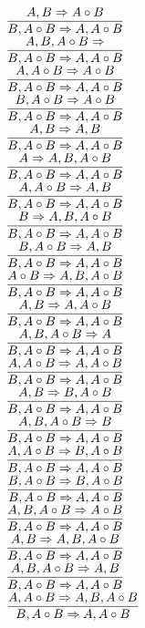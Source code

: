 \documentclass[11pt]{article}
\begin{document}
\begin{center}
\bigskip
\\$\infer{B, A\circ B\Rightarrow A, A\circ B}{A, B\Rightarrow A\circ B}$
\bigskip
\\$\infer{B, A\circ B\Rightarrow A, A\circ B}{A, B, A\circ B\Rightarrow }$
\bigskip
\\$\infer{B, A\circ B\Rightarrow A, A\circ B}{A, A\circ B\Rightarrow A\circ B}$
\bigskip
\\$\infer{B, A\circ B\Rightarrow A, A\circ B}{B, A\circ B\Rightarrow A\circ B}$
\bigskip
\\$\infer{B, A\circ B\Rightarrow A, A\circ B}{A, B\Rightarrow A, B}$
\bigskip
\\$\infer{B, A\circ B\Rightarrow A, A\circ B}{A\Rightarrow A, B, A\circ B}$
\bigskip
\\$\infer{B, A\circ B\Rightarrow A, A\circ B}{A, A\circ B\Rightarrow A, B}$
\bigskip
\\$\infer{B, A\circ B\Rightarrow A, A\circ B}{B\Rightarrow A, B, A\circ B}$
\bigskip
\\$\infer{B, A\circ B\Rightarrow A, A\circ B}{B, A\circ B\Rightarrow A, B}$
\bigskip
\\$\infer{B, A\circ B\Rightarrow A, A\circ B}{A\circ B\Rightarrow A, B, A\circ B}$
\bigskip
\\$\infer{B, A\circ B\Rightarrow A, A\circ B}{A, B\Rightarrow A, A\circ B}$
\bigskip
\\$\infer{B, A\circ B\Rightarrow A, A\circ B}{A, B, A\circ B\Rightarrow A}$
\bigskip
\\$\infer{B, A\circ B\Rightarrow A, A\circ B}{A, A\circ B\Rightarrow A, A\circ B}$
\bigskip
\\$\infer{B, A\circ B\Rightarrow A, A\circ B}{A, B\Rightarrow B, A\circ B}$
\bigskip
\\$\infer{B, A\circ B\Rightarrow A, A\circ B}{A, B, A\circ B\Rightarrow B}$
\bigskip
\\$\infer{B, A\circ B\Rightarrow A, A\circ B}{A, A\circ B\Rightarrow B, A\circ B}$
\bigskip
\\$\infer{B, A\circ B\Rightarrow A, A\circ B}{B, A\circ B\Rightarrow B, A\circ B}$
\bigskip
\\$\infer{B, A\circ B\Rightarrow A, A\circ B}{A, B, A\circ B\Rightarrow A\circ B}$
\bigskip
\\$\infer{B, A\circ B\Rightarrow A, A\circ B}{A, B\Rightarrow A, B, A\circ B}$
\bigskip
\\$\infer{B, A\circ B\Rightarrow A, A\circ B}{A, B, A\circ B\Rightarrow A, B}$
\bigskip
\\$\infer{B, A\circ B\Rightarrow A, A\circ B}{A, A\circ B\Rightarrow A, B, A\circ B}$

\end{center}
\end{document}
